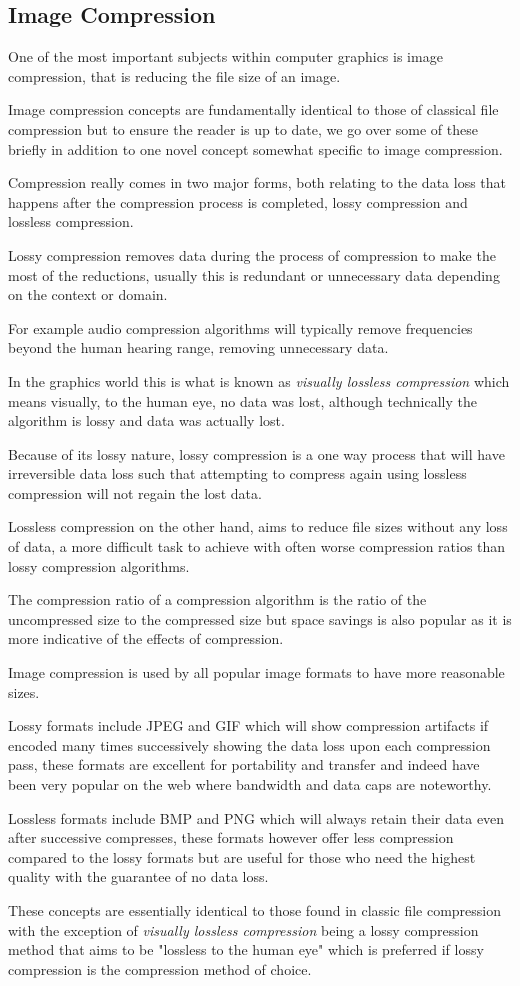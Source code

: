 \documentclass[12pt]{article}
\newcommand{\sentence}{} %
\newcommand{\italic}[1]{\textit{#1}}
\begin{document}
    \subsection{Image Compression}\label{subsec:image-compression}

    \tab
    One of the most important subjects within computer graphics is image compression, that is reducing the file size
    of an image.
    \sentence
    Image compression concepts are fundamentally identical to those of classical file compression but to ensure the
    reader is up to date, we go over some of these briefly in addition to one novel concept somewhat specific to
    image compression.
    \sentence
    Compression really comes in two major forms, both relating to the data loss that happens after the compression
    process is completed, lossy compression and lossless compression.
    \sentence
    Lossy compression removes data during the process of compression to make the most of the reductions, usually
    this is redundant or unnecessary data depending on the context or domain.
    \sentence
    For example audio compression algorithms will typically remove frequencies beyond the human hearing range,
    removing unnecessary data.
    \sentence
    In the graphics world this is what is known as \italic{visually lossless compression} which means visually, to
    the human eye, no data was lost, although technically the algorithm is lossy and data was actually lost\cite{rabbani_digital_1991}.
    \sentence
    Because of its lossy nature, lossy compression is a one way process that will have irreversible data loss such
    that attempting to compress again using lossless compression will not regain the lost data.
    \sentence
    Lossless compression on the other hand, aims to reduce file sizes without any loss of data, a more difficult task
    to achieve with often worse compression ratios than lossy compression algorithms.
    \sentence
    The compression ratio of a compression algorithm is the ratio of the uncompressed size to the compressed size but
    space savings is also popular as it is more indicative of the effects of compression.
    \sentence

    \bigskip
    Image compression is used by all popular image formats to have more reasonable sizes.
    \sentence
    Lossy formats include JPEG and GIF which will show compression artifacts if encoded many times successively
    showing the data loss upon each compression pass, these formats are excellent for portability and transfer and
    indeed have been very popular on the web where bandwidth and data caps are noteworthy\cite{rabbani_digital_1991}.
    \sentence
    Lossless formats include BMP and PNG which will always retain their data even after successive compresses, these
    formats however offer less compression compared to the lossy formats but are useful for those who need the
    highest quality with the guarantee of no data loss\cite{rabbani_digital_1991}.
    \sentence
    These concepts are essentially identical to those found in classic file compression with the exception of
    \italic{visually lossless compression} being a lossy compression method that aims to be "lossless to the human
    eye" which is preferred if lossy compression is the compression method of choice.
\end{document}
